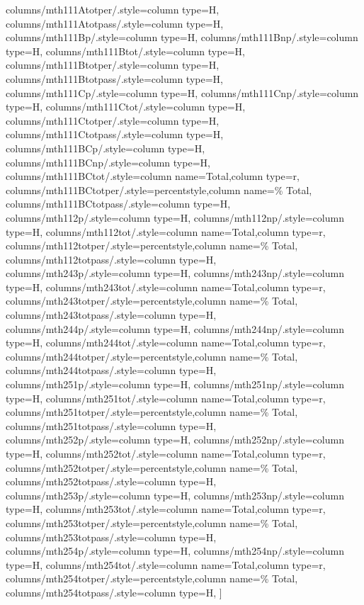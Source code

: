 \documentclass[varwidth]{standalone}
\begin{document}
{    columns/mth111Atotper/.style={column type=H},
    columns/mth111Atotpass/.style={column type=H},
    columns/mth111Bp/.style={column type=H},
    columns/mth111Bnp/.style={column type=H},
    columns/mth111Btot/.style={column type=H},
    columns/mth111Btotper/.style={column type=H},
    columns/mth111Btotpass/.style={column type=H},
    columns/mth111Cp/.style={column type=H},
    columns/mth111Cnp/.style={column type=H},
    columns/mth111Ctot/.style={column type=H},
    columns/mth111Ctotper/.style={column type=H},
    columns/mth111Ctotpass/.style={column type=H},
    columns/mth111BCp/.style={column type=H},
    columns/mth111BCnp/.style={column type=H},
    columns/mth111BCtot/.style={column name=Total,column type=r},
    columns/mth111BCtotper/.style={percentstyle,column name=\% Total},
    columns/mth111BCtotpass/.style={column type=H},
    columns/mth112p/.style={column type=H},
    columns/mth112np/.style={column type=H},
    columns/mth112tot/.style={column name=Total,column type=r},
    columns/mth112totper/.style={percentstyle,column name=\% Total},
    columns/mth112totpass/.style={column type=H},
    columns/mth243p/.style={column type=H},
    columns/mth243np/.style={column type=H},
    columns/mth243tot/.style={column name=Total,column type=r},
    columns/mth243totper/.style={percentstyle,column name=\% Total},
    columns/mth243totpass/.style={column type=H},
    columns/mth244p/.style={column type=H},
    columns/mth244np/.style={column type=H},
    columns/mth244tot/.style={column name=Total,column type=r},
    columns/mth244totper/.style={percentstyle,column name=\% Total},
    columns/mth244totpass/.style={column type=H},
    columns/mth251p/.style={column type=H},
    columns/mth251np/.style={column type=H},
    columns/mth251tot/.style={column name=Total,column type=r},
    columns/mth251totper/.style={percentstyle,column name=\% Total},
    columns/mth251totpass/.style={column type=H},
    columns/mth252p/.style={column type=H},
    columns/mth252np/.style={column type=H},
    columns/mth252tot/.style={column name=Total,column type=r},
    columns/mth252totper/.style={percentstyle,column name=\% Total},
    columns/mth252totpass/.style={column type=H},
    columns/mth253p/.style={column type=H},
    columns/mth253np/.style={column type=H},
    columns/mth253tot/.style={column name=Total,column type=r},
    columns/mth253totper/.style={percentstyle,column name=\% Total},
    columns/mth253totpass/.style={column type=H},
    columns/mth254p/.style={column type=H},
    columns/mth254np/.style={column type=H},
    columns/mth254tot/.style={column name=Total,column type=r},
    columns/mth254totper/.style={percentstyle,column name=\% Total},
    columns/mth254totpass/.style={column type=H},
]{\diversitydata}
}
\end{document}
